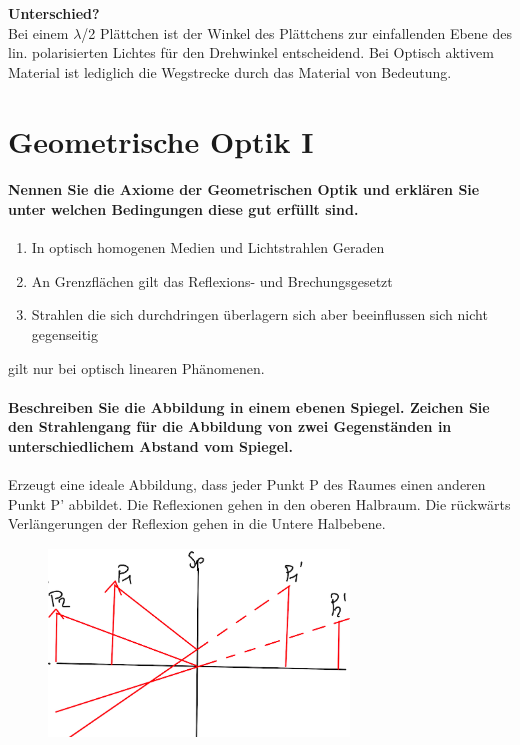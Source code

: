 \documentclass[a4paper, 11pt, ngerman, parskip=half-]{scrartcl}
\begin{document}
\textbf{Unterschied?}\\
Bei einem $\lambda$/2 Plättchen ist der Winkel des Plättchens zur einfallenden Ebene des lin. polarisierten Lichtes für den Drehwinkel entscheidend.
Bei Optisch aktivem Material ist lediglich die Wegstrecke durch das Material von Bedeutung.

\newpage

\section{Geometrische Optik I}


\paragraph{Nennen Sie die Axiome der Geometrischen Optik und erklären Sie unter welchen Bedingungen
    diese gut erfüllt sind.}

\begin{enumerate}
    \item In optisch homogenen Medien und Lichtstrahlen Geraden
    \item An Grenzflächen gilt das Reflexions- und Brechungsgesetzt
    \item Strahlen die sich durchdringen überlagern sich aber beeinflussen sich nicht gegenseitig
\end{enumerate}

gilt nur bei optisch linearen Phänomenen.

\paragraph{Beschreiben Sie die Abbildung in einem ebenen Spiegel. Zeichen Sie den Strahlengang für
    die Abbildung von zwei Gegenständen in unterschiedlichem Abstand vom Spiegel.}

Erzeugt eine ideale Abbildung, dass jeder Punkt P des Raumes einen anderen Punkt P' abbildet. Die Reflexionen gehen in den oberen Halbraum.  Die rückwärts Verlängerungen der Reflexion gehen in die Untere Halbebene.

\begin{figure}[H]
    \centering
    \includegraphics[width=8cm]{image/17/geo12}
\end{figure}
\end{document}
